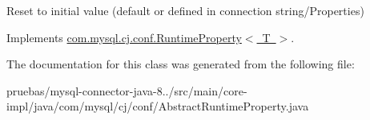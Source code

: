 Reset to initial value (default or defined in connection string/\+Properties) 

Implements \mbox{\hyperlink{interfacecom_1_1mysql_1_1cj_1_1conf_1_1_runtime_property_adad737e212723fc3f3da903259377a25}{com.\+mysql.\+cj.\+conf.\+Runtime\+Property$<$ T $>$}}.



The documentation for this class was generated from the following file\+:\begin{DoxyCompactItemize}
\item 
pruebas/mysql-\/connector-\/java-\/8../src/main/core-\/impl/java/com/mysql/cj/conf/Abstract\+Runtime\+Property.\+java\end{DoxyCompactItemize}
